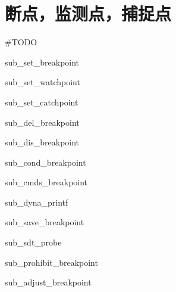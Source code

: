 \section{断点，监测点，捕捉点}

\#TODO

{sub_set_breakpoint}

{sub_set_watchpoint}

{sub_set_catchpoint}

{sub_del_breakpoint}

{sub_dis_breakpoint}

{sub_cond_breakpoint}

{sub_cmds_breakpoint}

{sub_dyna_printf}

{sub_save_breakpoint}

{sub_sdt_probe}

{sub_prohibit_breakpoint}

{sub_adjust_breakpoint}
